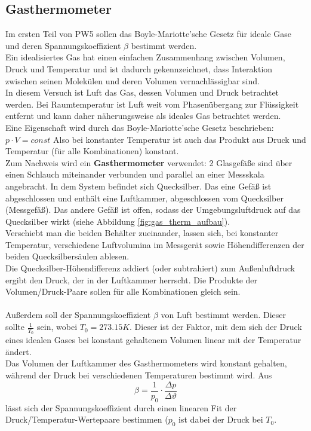 \documentclass[12pt,a4paper]{article}
\begin{document}
\pagebreak
\setlength{\columnsep}{20pt}
\begin{multicols}{2}

\section{Gasthermometer}
Im ersten Teil von PW5 sollen das Boyle-Mariotte'sche Gesetz für ideale Gase und deren Spannungskoeffizient $\beta$ bestimmt werden.\\
Ein idealisiertes Gas hat einen einfachen Zusammenhang zwischen Volumen, Druck und Temperatur und ist dadurch gekennzeichnet, dass Interaktion zwischen seinen Molekülen und deren Volumen vernachlässigbar sind.\\
In diesem Versuch ist Luft das Gas, dessen Volumen und Druck betrachtet werden. Bei Raumtemperatur ist Luft weit vom Phasenübergang zur Flüssigkeit entfernt und kann daher näherungsweise als ideales Gas betrachtet werden.\\
Eine Eigenschaft wird durch das Boyle-Mariotte'sche Gesetz beschrieben:\\
$p\cdot V= const$
Also bei konstanter Temperatur ist auch das Produkt aus Druck und Temperatur (für alle Kombinationen) konstant.\\
Zum Nachweis wird ein \textbf{Gasthermometer} verwendet: 2 Glasgefäße sind über einen Schlauch miteinander verbunden und parallel an einer Messskala angebracht. In dem System befindet sich Quecksilber. Das eine Gefäß ist abgeschlossen und enthält eine Luftkammer, abgeschlossen vom Quecksilber (Messgefäß). Das andere Gefäß ist offen, sodass der Umgebungsluftdruck auf das Quecksilber wirkt (siehe Abbildung \ref{fig:gas_therm_aufbau}).\\
Verschiebt man die beiden Behälter zueinander, lassen sich, bei konstanter Temperatur, verschiedene Luftvolumina im Messgerät sowie Höhendifferenzen der beiden Quecksilbersäulen ablesen.\\
Die Quecksilber-Höhendifferenz addiert (oder subtrahiert) zum Außenluftdruck ergibt den Druck, der in der Luftkammer herrscht. Die Produkte der Volumen/Druck-Paare sollen für alle Kombinationen gleich sein.\\
\\
Außerdem soll der Spannungskoeffizient $\beta$ von Luft bestimmt werden. Dieser sollte $\frac{1}{T_0}$ sein, wobei $T_0 = 273.15K$. Dieser ist der Faktor, mit dem sich der Druck eines idealen Gases bei konstant gehaltenem Volumen linear mit der Temperatur ändert.\\
Das Volumen der Luftkammer des Gasthermometers wird konstant gehalten, während der Druck bei verschiedenen Temperaturen bestimmt wird. Aus 
$$ \beta = \frac{1}{p_0} \cdot \frac{\Delta p}{\Delta \vartheta} $$
lässt sich der Spannungskoeffizient durch einen linearen Fit der Druck/Temperatur-Wertepaare bestimmen ($p_0$ ist dabei der Druck bei $T_0$.


\end{multicols}
\end{document}
